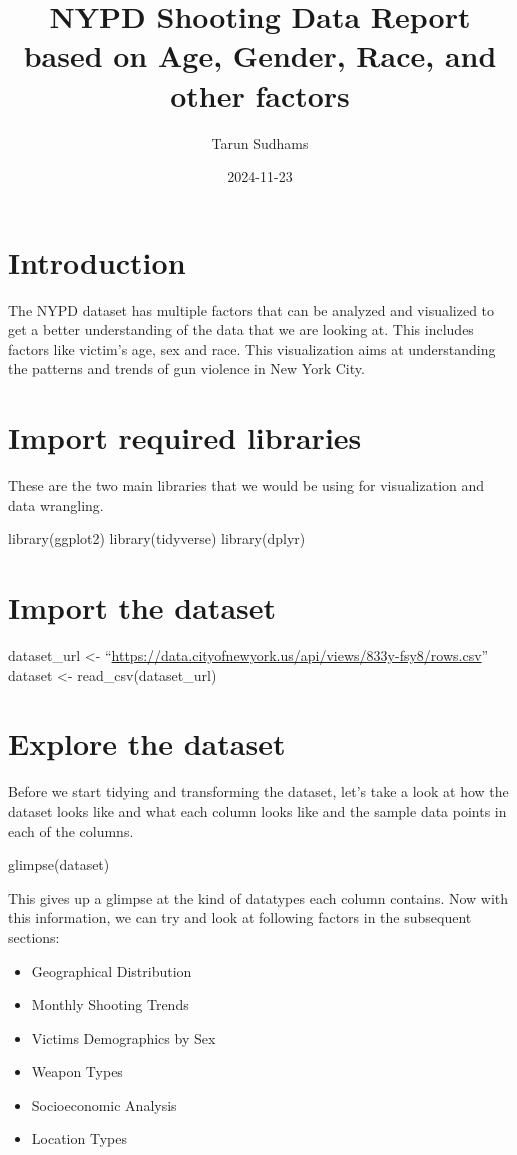 \documentclass[
]{article}
\title{NYPD Shooting Data Report based on Age, Gender, Race, and other
factors}
\author{Tarun Sudhams}
\date{2024-11-23}
\providecommand{\tightlist}{%
  \setlength{\itemsep}{0pt}\setlength{\parskip}{0pt}}
\begin{document}
\maketitle

\section{Introduction}\label{introduction}

The NYPD dataset has multiple factors that can be analyzed and
visualized to get a better understanding of the data that we are looking
at. This includes factors like victim's age, sex and race. This
visualization aims at understanding the patterns and trends of gun
violence in New York City.

\section{Import required libraries}\label{import-required-libraries}

These are the two main libraries that we would be using for
visualization and data wrangling.

library(ggplot2) library(tidyverse) library(dplyr)

\section{Import the dataset}\label{import-the-dataset}

dataset\_url \textless-
``\url{https://data.cityofnewyork.us/api/views/833y-fsy8/rows.csv}''
dataset \textless- read\_csv(dataset\_url)

\section{Explore the dataset}\label{explore-the-dataset}

Before we start tidying and transforming the dataset, let's take a look
at how the dataset looks like and what each column looks like and the
sample data points in each of the columns.

glimpse(dataset)

This gives up a glimpse at the kind of datatypes each column contains.
Now with this information, we can try and look at following factors in
the subsequent sections:

\begin{itemize}
\tightlist
\item
  Geographical Distribution
\item
  Monthly Shooting Trends
\item
  Victims Demographics by Sex
\item
  Weapon Types
\item
  Socioeconomic Analysis
\item
  Location Types
\end{itemize}
\end{document}
